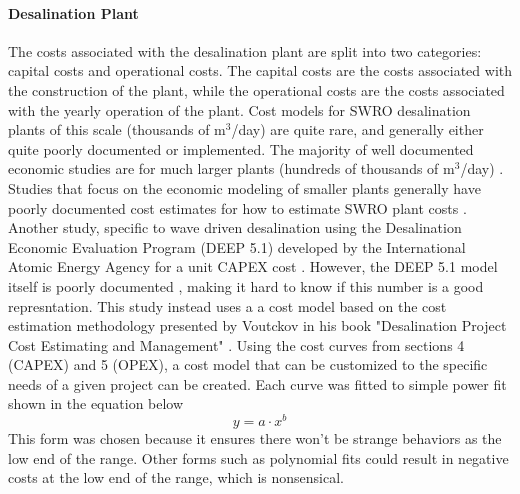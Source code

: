 \documentclass{article}
\begin{document}
\begin{multicols}{2}
\paragraph{Desalination Plant}
The costs associated with the desalination plant are split into two categories: capital costs and operational costs. The capital costs are the costs associated with the construction of the plant, while the operational costs are the costs associated with the yearly operation of the plant. Cost models for SWRO desalination plants of this scale (thousands of m$^3$/day) are quite rare, and generally either quite poorly documented or implemented. The majority of well documented economic studies are for much larger plants (hundreds of thousands of m$^3$/day) \cite{Slocum2016,Haefner2023,roopexcurve,Wittholz2008}. Studies that focus on the economic modeling of smaller plants generally have poorly documented cost estimates for how to estimate SWRO plant costs \cite{Elkadeem2024,Goekcek2016}. Another study, specific to wave driven desalination using the Desalination Economic Evaluation Program (DEEP 5.1) developed by the International Atomic Energy Agency for a unit CAPEX cost \cite{Yu2022}. However, the DEEP 5.1 model itself is poorly documented \cite{DEEP5manual}, making it hard to know if this number is a good represntation. 
This study instead uses a a cost model based on the cost estimation methodology presented by Voutckov in his book "Desalination Project Cost Estimating and Management" \cite{voutch}. Using the cost curves from sections 4 (CAPEX) and 5 (OPEX), a cost model that can be customized to the specific needs of a given project can be created. Each curve was fitted to simple power fit shown in the equation below
\begin{equation}
    y = a \cdot x^b
\end{equation}
This form was chosen because it ensures there won't be strange behaviors as the low end of the range. Other forms such as polynomial fits could result in negative costs at the low end of the range, which is nonsensical.
\end{multicols}
\end{document}

